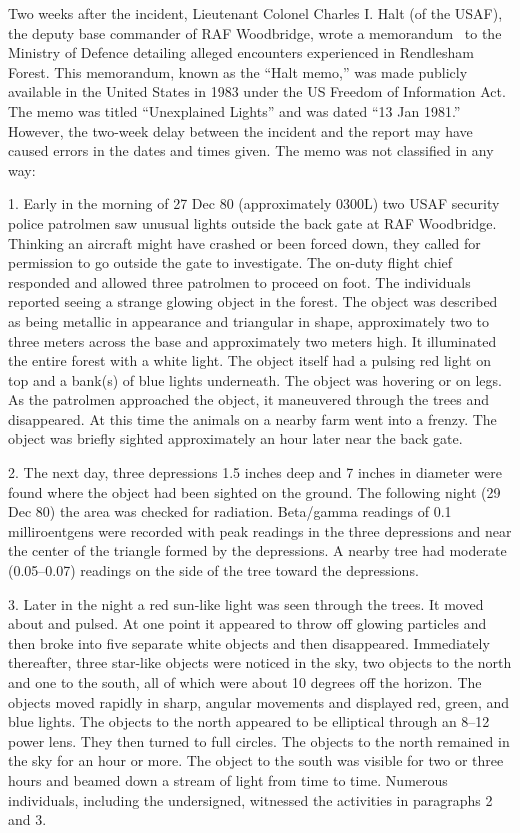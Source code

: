 Two weeks after the incident,
Lieutenant Colonel Charles I. Halt (of the USAF), the deputy base commander of RAF Woodbridge,
wrote a memorandum~\cite{HaltMemo1981,Ridpath} to the Ministry of Defence  detailing alleged encounters experienced in Rendlesham Forest.
This memorandum, known as the ``Halt memo,'' was made publicly available in the United States in 1983 under the US Freedom of Information Act.
The memo was titled ``Unexplained Lights'' and was dated ``13 Jan 1981.''
However, the two-week delay between the incident and the report may have caused errors in the dates and times given.
The memo was not classified in any way:
\begin{svgraybox}
1.  Early in the morning of 27 Dec 80 (approximately 0300L) two USAF security police patrolmen
saw unusual lights outside the back gate at RAF Woodbridge. Thinking an aircraft might have crashed or been forced down,
they called for permission to go outside the gate to investigate. The on-duty flight chief responded and
allowed three patrolmen to proceed on foot. The individuals reported seeing a strange glowing object in the forest.
The object was described as being metallic in appearance and triangular in shape,
approximately two to three meters across the base and approximately two meters high.
It illuminated the entire forest with a white light.
 The object itself had a pulsing red light on top and a bank(s) of blue lights underneath.
The object was hovering or on legs. As the patrolmen approached the object, it maneuvered through the trees and disappeared.
At this time the animals on a nearby farm went into a frenzy. The object was briefly sighted approximately an hour later near the back gate.



2.  The next day, three depressions 1.5 inches deep and 7 inches in diameter were found where the object had been sighted on the ground. The following night (29 Dec 80) the area was checked for radiation. Beta/gamma readings of 0.1 milliroentgens were recorded with peak readings in the three depressions and near the center of the triangle formed by the depressions. A nearby tree had moderate (0.05--0.07) readings on the side of the tree toward the depressions.



3.  Later in the night a red sun-like light was seen through the trees. It moved about and pulsed. At one point it appeared to throw off glowing particles and then broke into five separate white objects and then disappeared. Immediately thereafter, three star-like objects were noticed in the sky, two objects to the north and one to the south, all of which were about 10 degrees off the horizon. The objects moved rapidly in sharp, angular movements and displayed red, green, and blue lights. The objects to the north appeared to be elliptical through an 8--12 power lens. They then turned to full circles. The objects to the north remained in the sky for an hour or more. The object to the south was visible for two or three hours and beamed down a stream of light from time to time. Numerous individuals, including the undersigned, witnessed the activities in paragraphs 2 and 3.




\end{svgraybox}
